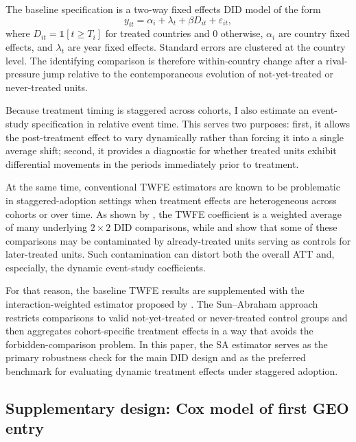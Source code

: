 \documentclass[11pt]{article}
\begin{document}
The baseline specification is a two-way fixed effects DID model of the form
\begin{equation}
    y_{it} = \alpha_i + \lambda_t + \beta D_{it} + \varepsilon_{it},
\end{equation}
where $D_{it} = \mathbb{1}[t \geq T_i]$ for treated countries and $0$ otherwise, $\alpha_i$ are country fixed effects, and $\lambda_t$ are year fixed effects. Standard errors are clustered at the country level. The identifying comparison is therefore within-country change after a rival-pressure jump relative to the contemporaneous evolution of not-yet-treated or never-treated units.

Because treatment timing is staggered across cohorts, I also estimate an event-study specification in relative event time. This serves two purposes: first, it allows the post-treatment effect to vary dynamically rather than forcing it into a single average shift; second, it provides a diagnostic for whether treated units exhibit differential movements in the periods immediately prior to treatment.

At the same time, conventional TWFE estimators are known to be problematic in staggered-adoption settings when treatment effects are heterogeneous across cohorts or over time. As shown by \citet{goodmanbacon2021}, the TWFE coefficient is a weighted average of many underlying $2\times2$ DID comparisons, while \citet{dechaisemartin2020} and \citet{sunab2021} show that some of these comparisons may be contaminated by already-treated units serving as controls for later-treated units. Such contamination can distort both the overall ATT and, especially, the dynamic event-study coefficients.

For that reason, the baseline TWFE results are supplemented with the interaction-weighted estimator proposed by \citet{sunab2021}. The Sun--Abraham approach restricts comparisons to valid not-yet-treated or never-treated control groups and then aggregates cohort-specific treatment effects in a way that avoids the forbidden-comparison problem. In this paper, the SA estimator serves as the primary robustness check for the main DID design and as the preferred benchmark for evaluating dynamic treatment effects under staggered adoption.

\subsection{Supplementary design: Cox model of first GEO entry}
\end{document}
